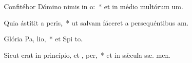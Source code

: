 \item Confitébor Dómino nimis in  o:~* et in médio multórum  um.
\item Quia ástitit a  peris,~* ut salvam fáceret a persequéntibus  am.
\item Glória Pa,  lio,~* et Spi to.
\item Sicut erat in princípio, et ,  per,~* et in sǽcula sæ. men.
